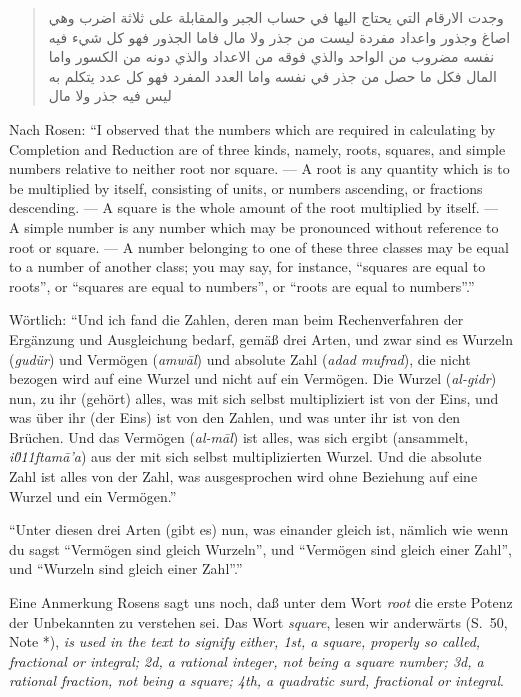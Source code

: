 \documentclass[11pt,a4paper]{article}
\newcommand{\RL}[1]{\beginR#1\endR}
\newcommand{\ar}[1]{{\arabicfont\RL{#1}}}
\newcommand{\enquote}[1]{``#1''}
\begin{document}
\begin{quote}
\ar{وجدت الارقام التي يحتاج اليها في حساب الجبر والمقابلة على ثلاثة اضرب وهي اصاغ وجذور واعداد مفردة ليست من جذر ولا مال فاما الجذور فهو كل شيء فيه نفسه مضروب من الواحد والذي فوقه من الاعداد والذي دونه من الكسور واما المال فكل ما حصل من جذر في نفسه واما العدد المفرد فهو كل عدد يتكلم به ليس فيه جذر ولا مال}
\end{quote}

Nach Rosen: \enquote{I observed that the numbers which are required in calculating by Completion and Reduction are of three kinds, namely, roots, squares, and simple numbers relative to neither root nor square. --- A root is any quantity which is to be multiplied by itself, consisting of units, or numbers ascending, or fractions descending. --- A square is the whole amount of the root multiplied by itself. --- A simple number is any number which may be pronounced without reference to root or square. --- A number belonging to one of these three classes may be equal to a number of another class; you may say, for instance, \enquote{squares are equal to roots}, or \enquote{squares are equal to numbers}, or \enquote{roots are equal to numbers}.}

W\"ortlich: \enquote{Und ich fand die Zahlen, deren man beim Rechenverfahren der Erg\"anzung und Ausgleichung bedarf, gem\"a\ss{} drei Arten, und zwar sind es Wurzeln (\textit{gud\"ur}) und Verm\"ogen (\textit{amw\=al}) und absolute Zahl (\textit{adad mufrad}), die nicht bezogen wird auf eine Wurzel und nicht auf ein Verm\"ogen. Die Wurzel (\textit{al-gidr}) nun, zu ihr (geh\"ort) alles, was mit sich selbst multipliziert ist von der Eins, und was \"uber ihr (der Eins) ist von den Zahlen, und was unter ihr ist von den Br\"uchen. Und das Verm\"ogen (\textit{al-m\=al}) ist alles, was sich ergibt (ansammelt, \textit{i\u011ftam\=a'a}) aus der mit sich selbst multiplizierten Wurzel. Und die absolute Zahl ist alles von der Zahl, was ausgesprochen wird ohne Beziehung auf eine Wurzel und ein Verm\"ogen.}

\enquote{Unter diesen drei Arten (gibt es) nun, was einander gleich ist, n\"amlich wie wenn du sagst \enquote{Verm\"ogen sind gleich Wurzeln}, und \enquote{Verm\"ogen sind gleich einer Zahl}, und \enquote{Wurzeln sind gleich einer Zahl}.}

Eine Anmerkung Rosens sagt uns noch, da\ss{} unter dem Wort \textit{root} die erste Potenz der Unbekannten zu verstehen sei. Das Wort \textit{square}, lesen wir anderw\"arts (S.\ 50, Note *), \textit{is used in the text to signify either, 1st, a square, properly so called, fractional or integral; 2d, a rational integer, not being a square number; 3d, a rational fraction, not being a square; 4th, a quadratic surd, fractional or integral}.
\end{document}
